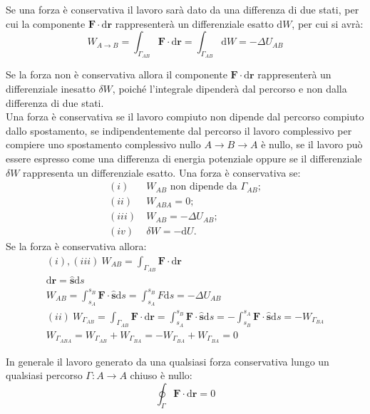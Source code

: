 \documentclass{article}
\newcommand{\vect}[1]{\boldsymbol{\mathbf{#1}}}
\newcommand{\df}{\mathrm{d}}
\numberwithin{equation}{subsection}
\begin{document}
Se una forza è conservativa il lavoro sarà dato da una differenza di due stati, per cui la componente $\vect{F}\cdot \df\vect{r}$ rappresenterà un differenziale esatto $\df W$, per 
cui si avrà: 
\begin{equation}
    W_{A\to B}=\displaystyle\int_{\Gamma_{AB}}\vect{F}\cdot  \df\vect{r}=\int_{\Gamma_{AB}}\df W=-\Delta U_{AB}
\end{equation}

Se la forza non è conservativa allora il componente $\vect{F}\cdot \df\vect{r}$ rappresenterà un differenziale inesatto $\delta W$, poiché l'integrale dipenderà dal percorso 
e non dalla differenza di due stati. 
\\
Una forza è conservativa se il lavoro compiuto non dipende dal percorso compiuto dallo spostamento, se indipendentemente dal percorso il lavoro complessivo per compiere uno 
spostamento complessivo nullo $A\to B\to A$ è nullo, se il lavoro può essere espresso come una differenza di energia potenziale oppure se il differenziale $\delta W$ rappresenta un 
differenziale esatto. 
Una forza è conservativa se:
\begin{align*}
    (i)\:& W_{AB} \mbox{ non dipende da }\Gamma_{AB};\\
    (ii)\:&W_{ABA}=0;\\
    (iii)\:& W_{AB}=-\Delta U_{AB};\\
    (iv)\:& \delta W =-\df U.
\end{align*}
Se la forza è conservativa allora:
\begin{gather*}
    (i),(iii)\:W_{AB}=\displaystyle\int_{\Gamma_{AB}}\vect{F}\cdot \df\vect{r}\\
    \df\vect{r}=\hat{\vect{s}}\df s\\
    W_{AB}=\int_{s_A}^{s_B}\vect{F}\cdot\hat{\vect{s}}\df s=\int_{s_A}^{s_B}F \df s=-\Delta U_{AB} \\
    (ii)\:W_{\Gamma_{AB}}=\displaystyle\int_{\Gamma_{AB}}\vect{F}\cdot \df\vect{r}=\int_{s_A}^{s_B}\vect{F}\cdot\hat{\vect{s}}\df s=-\int_{s_B}^{s_A}\vect{F}\cdot\hat{\vect{s}}\df s=-W_{\Gamma_{BA}}\\
    W_{\Gamma_{ABA}}=W_{\Gamma_{AB}}+W_{\Gamma_{BA}}=-W_{\Gamma_{BA}}+W_{\Gamma_{BA}}=0
\end{gather*}

In generale il lavoro generato da una qualsiasi forza conservativa lungo un qualsiasi percorso $\Gamma: A\to A $ chiuso è nullo:
\begin{equation*}
    \oint_{\Gamma}\vect{F}\cdot \df\vect{r}=0
\end{equation*}
\end{document}
